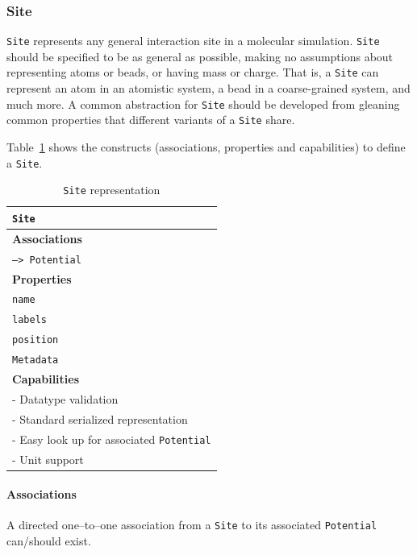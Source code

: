 \documentclass[12pt]{article}
\begin{document}
\subsubsection{Site}
\texttt{Site} represents any general interaction site in a molecular simulation. \texttt{Site} should be specified to be as general as possible, making no assumptions about representing atoms or beads, or having mass or charge. That is, a \texttt{Site} can represent an atom in an atomistic system, a bead in a coarse-grained system, and much more. A common abstraction for \texttt{Site} should be developed from gleaning common properties that different variants of a \texttt{Site} share.

Table~\ref{tab:SiteSpec} shows  the constructs (associations, properties and capabilities) to define a \texttt{Site}.

\begin{table}[ht]
    \centering
     \caption{\texttt{Site} representation}
    \begin{tabular}{|l|}
         \hline
         \rowcolor{gray!50}
         \texttt{Site}  \\
         \hline
         \textbf{Associations} \\
         \hline
         \texttt{--> Potential}\\
         \textbf{Properties}\\
         \hline
         \texttt{name} \\
         \texttt{labels} \\
         \texttt{position}\\
         \texttt{Metadata}\\
         \hline
         \textbf{Capabilities}\\
         \hline
         - Datatype validation \\
         - Standard serialized representation \\
         - Easy look up for associated \texttt{Potential} \\
         - Unit support \\
        \hline
    \end{tabular}
    \label{tab:SiteSpec}
\end{table}
\paragraph{Associations}
A directed one--to--one association from a  \texttt{Site} to its associated \texttt{Potential} can/should exist.
\end{document}
